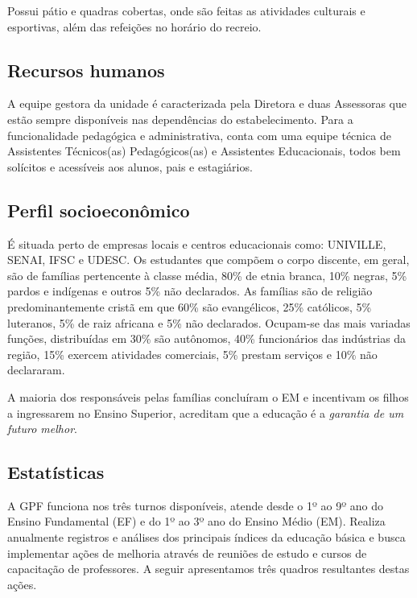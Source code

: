 Possui pátio e quadras cobertas, onde são feitas as atividades culturais e esportivas, além das refeições no horário do recreio.

\subsection{Recursos humanos}
A equipe gestora da unidade é caracterizada pela Diretora e duas Assessoras que estão sempre disponíveis nas dependências do estabelecimento. Para a funcionalidade pedagógica e administrativa, conta com uma equipe técnica de Assistentes Técnicos(as) Pedagógicos(as) e Assistentes Educacionais, todos bem solícitos e acessíveis aos alunos, pais e estagiários.

\subsection{Perfil socioeconômico}
É situada perto de empresas locais e centros educacionais como: UNIVILLE, SENAI, IFSC e UDESC. Os estudantes que compõem o corpo discente, em geral, são de famílias pertencente à classe média, 80\% de etnia branca, 10\% negras, 5\% pardos e indígenas e outros 5\% não declarados. As famílias são de religião predominantemente cristã em que 60\% são evangélicos, 25\% católicos, 5\% luteranos, 5\% de raiz africana e 5\% não declarados. Ocupam-se das mais variadas funções, distribuídas em 30\% são autônomos, 40\% funcionários das indústrias da região, 15\% exercem atividades comerciais, 5\% prestam serviços e 10\% não declararam.

A maioria dos responsáveis pelas famílias concluíram o EM e incentivam os filhos a ingressarem no Ensino Superior, acreditam que a educação é a \emph{garantia de um futuro melhor}.

\subsection{Estatísticas}
A GPF funciona nos três turnos disponíveis, atende desde o 1º ao 9º ano do Ensino Fundamental (EF) e do 1º ao 3º ano do Ensino Médio (EM). Realiza anualmente registros e análises dos principais índices da educação básica e busca implementar ações  de melhoria através de reuniões de estudo e cursos de capacitação de professores. A seguir apresentamos três quadros resultantes destas ações.

